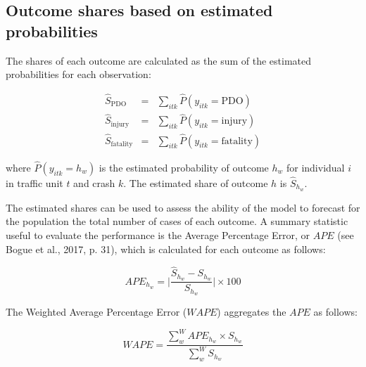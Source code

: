 \documentclass[]{elsarticle} %
\begin{document}
\hypertarget{outcome-shares-based-on-estimated-probabilities}{%
\subsection{Outcome shares based on estimated
probabilities}\label{outcome-shares-based-on-estimated-probabilities}}

The shares of each outcome are calculated as the sum of the estimated
probabilities for each observation:

\begin{equation}
\label{eq:predicted-shares}
\begin{array}{rcl}
\hat{S}_{\text{PDO}} &=& \sum_{itk}\hat{P}(y_{itk}=\text{PDO})\\
\hat{S}_{\text{injury}} &=& \sum_{itk}\hat{P}(y_{itk}=\text{injury})\\
\hat{S}_{\text{fatality}} &=& \sum_{itk}\hat{P}(y_{itk}=\text{fatality})
\end{array}
\end{equation}

\noindent where \(\hat{P}(y_{itk}=h_w)\) is the estimated probability of
outcome \(h_w\) for individual \(i\) in traffic unit \(t\) and crash
\(k\). The estimated share of outcome \(h\) is \(\hat{S}_{h_w}\).

The estimated shares can be used to assess the ability of the model to
forecast for the population the total number of cases of each outcome. A
summary statistic useful to evaluate the performance is the Average
Percentage Error, or \(APE\) (see Bogue et al., 2017, p. 31), which is
calculated for each outcome as follows:

\begin{equation}
\label{eq:APE}
APE_{h_w} = \Bigg|\frac{\hat{S}_{h_w} - S_{h_w}}{S_{h_w}}\Bigg|\times 100
\end{equation}

The Weighted Average Percentage Error (\(WAPE\)) aggregates the \(APE\)
as follows:

\begin{equation}
\label{eq:WAPE}
WAPE = \frac{\sum_w^WAPE_{h_w}\times S_{h_w}}{\sum_w^WS_{h_w}}
\end{equation}
\end{document}
